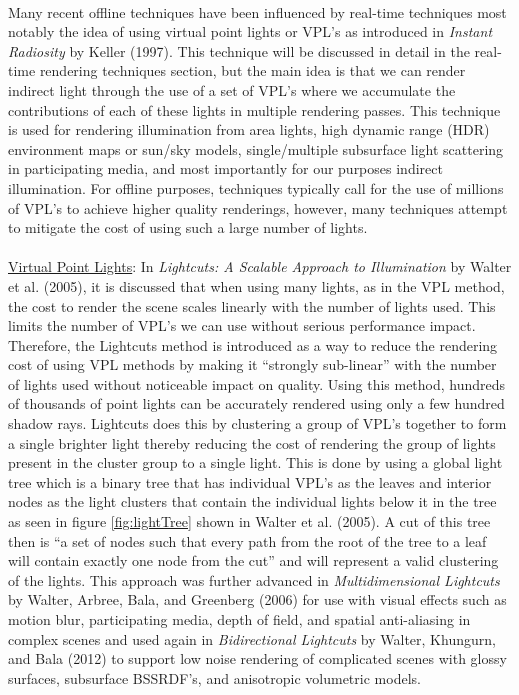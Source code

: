 \paragraph{}
Many recent offline techniques have been influenced by real-time techniques most notably the idea of using virtual point lights or VPL's as introduced in \textit{Instant Radiosity} by Keller (1997).  This technique will be discussed in detail in the real-time rendering techniques section, but the main idea is that we can render indirect light through the use of a set of VPL's where we accumulate the contributions of each of these lights in multiple rendering passes.  This technique is used for rendering illumination from area lights, high dynamic range (HDR) environment maps or sun/sky models, single/multiple subsurface light scattering in participating media, and most importantly for our purposes indirect illumination.  For offline purposes, techniques typically call for the use of millions of VPL's to achieve higher quality renderings, however, many techniques attempt to mitigate the cost of using such a large number of lights.

\paragraph{}
\underline{Virtual Point Lights}: In \textit{Lightcuts: A Scalable Approach to Illumination} by Walter et al. (2005), it is discussed that when using many lights, as in the VPL method, the cost to render the scene scales linearly with the number of lights used.  This limits the number of VPL's we can use without serious performance impact.  Therefore, the Lightcuts method is introduced as a way to reduce the rendering cost of using VPL methods by making it “strongly sub-linear” with the number of lights used without noticeable impact on quality.  Using this method, hundreds of thousands of point lights can be accurately rendered using only a few hundred shadow rays.  Lightcuts does this by clustering a group of VPL's together to form a single brighter light thereby reducing the cost of rendering the group of lights present in the cluster group to a single light.  This is done by using a global light tree which is a binary tree that has individual VPL's as the leaves and interior nodes as the light clusters that contain the individual lights below it in the tree as seen in figure \ref{fig:lightTree} shown in Walter et al. (2005).  A cut of this tree then is ``a set of nodes such that every path from the root of the tree to a leaf will contain exactly one node from the cut'' and will represent a valid clustering of the lights.  This approach was further advanced in \textit{Multidimensional Lightcuts} by Walter, Arbree, Bala, and Greenberg (2006) for use with visual effects such as motion blur, participating media, depth of field, and spatial anti-aliasing in complex scenes and used again in \textit{Bidirectional Lightcuts} by Walter, Khungurn, and Bala (2012) to support low noise rendering of complicated scenes with glossy surfaces, subsurface BSSRDF's, and anisotropic volumetric models.

